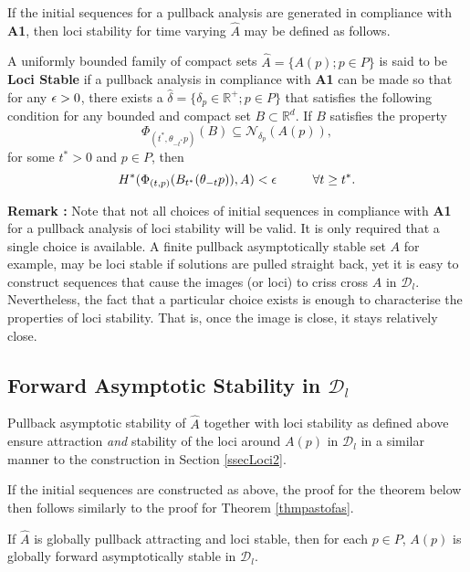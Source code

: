 If the initial sequences for a pullback analysis are generated in compliance
with \textbf{A1}, then loci stability for time varying $\hat{A}$ may be defined
as follows.

\begin{defn}\label{defnlocistabhatA}
A uniformly bounded family of compact sets $\hat{A} = \{ A(p); p \in P \}$ is
said to be {\bf Loci Stable} if a pullback analysis in compliance with
\textbf{A1} can be made so that for any $\epsilon > 0$, there exists a
$\hat{\delta} = \{ \delta_p \in \mathbb{R}^+ ; p \in P \}$ that satisfies the
following condition for any bounded and compact set $B \subset \mathbb{R}^d$.
If $B$ satisfies the property
\[ \Phi_{(t^*, \theta_{-t^*}p)}(B) \subseteq
                     \mathcal{N}_{\delta_p}(A(p)), \]
for some $t^* > 0$ and $p \in P$, then
\[ H^*(\Phi_{(t, p)}(B_{t^*}(\theta_{-t}p)), A) < \epsilon \hspace{1cm} \forall t \geq
             t^*. \]
\end{defn}

{\bf Remark : } Note that not all choices of initial sequences in
compliance with \textbf{A1} for a pullback analysis of loci
stability will be valid. It is only required that a single choice
is available. A finite pullback asymptotically stable set $A$ for
example, may be loci stable if solutions are pulled straight back,
yet it is easy to construct sequences that cause the images (or
loci) to criss cross $A$ in $\mathcal{D}_l$. Nevertheless, the
fact that a particular choice exists is enough to characterise the
properties of loci stability. That is, once the image is close, it
stays relatively close.

\subsection{Forward Asymptotic Stability in $\mathcal{D}_l$}

Pullback asymptotic stability of $\hat{A}$ together with loci stability as
defined above ensure attraction \textit{and} stability of the loci around $A(p)$
in $\mathcal{D}_l$ in a similar manner to the construction in Section
\ref{ssecLoci2}.

If the initial sequences are constructed as above,  the proof for the theorem
below then follows similarly to the proof for Theorem \ref{thmpastofas}.

\begin{therm}
\label{thmpastofashatA}
If $\hat{A}$ is globally pullback attracting and loci stable, then for
each $p \in P$, $A(p)$ is globally forward asymptotically stable in
$\mathcal{D}_l$.
\end{therm}

